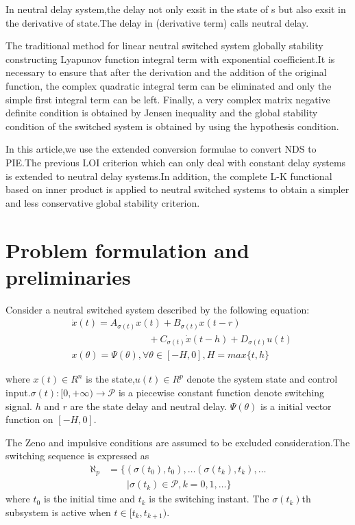 \documentclass[twocolumn]{autart}    %
\begin{document}
In neutral delay system,the delay not only exsit in the state of s but also exsit in the derivative 
of state.The delay in (derivative term) calls neutral delay.

The traditional method for linear neutral switched system globally stability
constructing Lyapunov function integral term with exponential coefficient.It is necessary to ensure that after the derivation 
and the addition of the original function, the complex quadratic integral term can be eliminated and only the simple first 
integral term can be left. Finally, a very complex matrix negative definite condition is obtained by Jensen inequality and the 
global stability condition of the switched system is obtained by using the hypothesis condition.

In this article,we use the extended conversion formulae to convert NDS to PIE.The previous LOI criterion which can only deal with constant delay 
systems is extended to neutral delay systems.In addition, the complete L-K functional based on inner product is applied to neutral switched systems 
to obtain a simpler and less conservative global stability criterion.

\section{Problem formulation and preliminaries}

Consider a neutral switched system described by the following equation:
\begin{equation} \label{e1}
    \begin{aligned}
        &\dot{x}(t) = A_{\sigma(t)}x(t) + B_{\sigma(t)}x(t-r) \\
        & \qquad \qquad \qquad \qquad + C_{\sigma(t)}\dot{x}(t-h)+ D_{\sigma(t)}u(t) \\
        &x(\theta) = \Psi(\theta),\forall \theta \in [-H,0],H = max\{t,h\}
    \end{aligned}
\end{equation}

where $x(t) \in R^{n}$ is the state,$u(t) \in R^{p}$ denote the system state and control input.$\sigma(t):[0,+\infty) \rightarrow \mathcal{P}$ 
is a piecewise constant function denote switching signal. $h$ and $r$ are the state delay and neutral delay.
$\Psi(\theta)$ is a initial vector function on $[-H,0]$.

The Zeno and impulsive conditions are assumed to be excluded consideration.The switching sequence is expressed as 
\begin{equation} \label{e1}
    \begin{aligned}
        \aleph _{p} &= \{(\sigma(t_{0}),t_{0}),\ldots (\sigma(t_{k}),t_{k}),\ldots\\
        & \qquad |\sigma(t_{k}) \in \mathcal{P},k = 0,1,\ldots\}
    \end{aligned}
\end{equation}
where $t_{0}$ is the initial time and  $t_{k}$ is the switching instant. The $\sigma(t_{k})$th subsystem is active when $t \in [t_{k},t_{k+1})$. 
\end{document}
